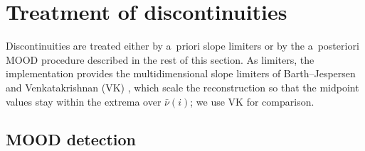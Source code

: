 \documentclass[smallextended]{svjour3}
\numberwithin{equation}{section}
\newcommand{\cnb}{\bar\nu}
\begin{document}
\section{Treatment of discontinuities}\label{sec:mood}

Discontinuities are treated either by a~priori slope limiters or by the a~posteriori MOOD procedure described in the rest of this section. As limiters, the implementation provides the multidimensional slope limiters of Barth--Jespersen \cite{BarthJespersen1989} and Venkatakrishnan (VK) \cite{Venkatakrishnan1995}, which scale the reconstruction so that the midpoint values stay within the extrema over $\cnb(i)$; we use VK for comparison.\label{sec:limiters}

\subsection{MOOD detection}\label{sec:criteria}
\end{document}

